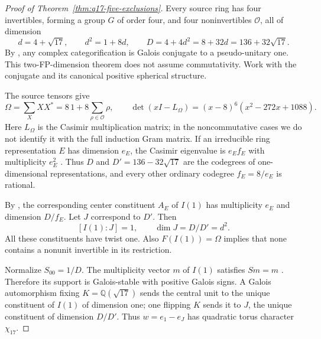 \begin{proof}[Proof of Theorem~\ref{thm:q17-five-exclusions}]
Every source ring has four invertibles, forming a group $G$ of order
four, and four noninvertibles $\mathcal O$, all of dimension
\[
d=4+\sqrt{17},\qquad d^2=1+8d,\qquad
D=4+4d^2=8+32d=136+32\sqrt{17}.
\]
By \cite[Lemma~3.1]{SchNear}, any complex categorification is Galois
conjugate to a pseudo-unitary one. This two-FP-dimension theorem does
not assume commutativity. Work with the conjugate and its canonical
positive spherical structure.

The source tensors give
\[
\Omega=\sum_X XX^*=8\,1+8\sum_{\rho\in\mathcal O}\rho,
\qquad
\det(xI-L_\Omega)=(x-8)^6(x^2-272x+1088).
\]
Here $L_\Omega$ is the Casimir multiplication matrix; in the
noncommutative cases we do not identify it with the full induction
Gram matrix. If an irreducible ring representation $E$ has dimension
$e_E$, the Casimir eigenvalue is $e_E f_E$ with multiplicity $e_E^2$
\cite[Remark~2.11]{OstrikPiv3}. Thus $D$ and
$D'=136-32\sqrt{17}$ are the codegrees of one-dimensional
representations, and every other ordinary codegree $f_E=8/e_E$ is
rational.

By \cite[Theorem~2.13]{OstrikPiv3}, the corresponding center constituent
$A_E$ of $I(1)$ has multiplicity $e_E$ and dimension $D/f_E$.
Let $J$ correspond to $D'$. Then
\[
[I(1):J]=1,\qquad \dim J=D/D'=d^2.
\]
All these constituents have twist one. Also $F(I(1))=\Omega$ implies
that none contains a nonunit invertible in its restriction.

Normalize $S_{00}=1/D$. The multiplicity vector $m$ of $I(1)$ satisfies
$Sm=m$ \cite[Proposition~2.8]{OstrikPiv3}. Therefore its support is
Galois-stable with positive Galois signs. A Galois automorphism fixing
$K=\mathbb Q(\sqrt{17})$ sends the central unit to the unique constituent
of $I(1)$ of dimension one; one flipping $K$ sends it to $J$, the unique
constituent of dimension $D/D'$. Thus
$w=e_1-e_J$ has quadratic torus character $\chi_{17}$.


\end{proof}
